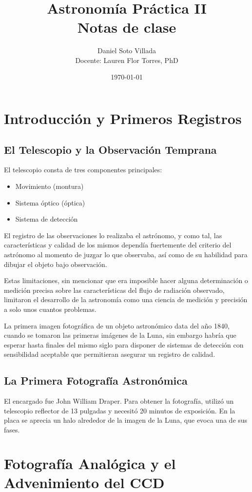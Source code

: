 \documentclass{article}
\title{Astronomía Práctica II\\[0.4em]\large Notas de clase}
\author{Daniel Soto Villada\\[0.4em]\normalsize Docente: Lauren Flor Torres, PhD}
\date{\today}
\begin{document}
\maketitle
\tableofcontents


\section{Introducción y Primeros Registros}

\subsection{El Telescopio y la Observación Temprana}
El telescopio consta de tres componentes principales:
\begin{itemize}
    \item Movimiento (montura)
    \item Sistema óptico (óptica)
    \item Sistema de detección
\end{itemize}

El registro de las observaciones lo realizaba el astrónomo, y como tal, las características y calidad de los mismos dependía fuertemente del criterio del astrónomo al momento de juzgar lo que observaba, así como de su habilidad para dibujar el objeto bajo observación.

Estas limitaciones, sin mencionar que era imposible hacer alguna determinación o medición precisa sobre las características del flujo de radiación observado, limitaron el desarrollo de la astronomía como una ciencia de medición y precisión a solo unos cuantos problemas.

La primera imagen fotográfica de un objeto astronómico data del año 1840, cuando se tomaron las primeras imágenes de la Luna, sin embargo habría que esperar hasta finales del mismo siglo para disponer de sistemas de detección con sensibilidad aceptable que permitieran asegurar un registro de calidad.

\subsection{La Primera Fotografía Astronómica}
El encargado fue John William Draper. Para obtener la fotografía, utilizó un telescopio reflector de 13 pulgadas y necesitó 20 minutos de exposición. En la placa se aprecia un halo alrededor de la imagen de la Luna, que evoca una de sus fases.


\section{Fotografía Analógica y el Advenimiento del CCD}
\end{document}
